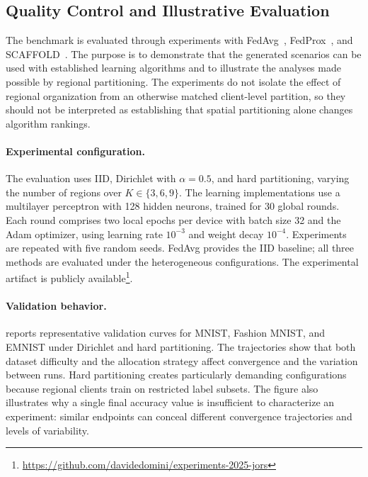 \subsection{Quality Control and Illustrative Evaluation}
\label{sec:profed-quality-control}

The benchmark is evaluated through experiments with
 FedAvg~\cite{DBLP:conf/aistats/McMahanMRHA17},
 FedProx~\cite{DBLP:conf/mlsys/LiSZSTS20}, and
 SCAFFOLD~\cite{DBLP:conf/icml/KarimireddyKMRS20}.
%
The purpose is to demonstrate that the generated scenarios can be used
 with established learning algorithms and to illustrate the analyses made
 possible by regional partitioning.
%
The experiments do not isolate the effect of regional organization from
 an otherwise matched client-level partition, so they should not be
 interpreted as establishing that spatial partitioning alone changes
 algorithm rankings.

\paragraph{Experimental configuration.}
The evaluation uses IID, Dirichlet with $\alpha=0.5$, and hard partitioning,
 varying the number of regions over $K\in\{3,6,9\}$.
%
The learning implementations use a multilayer perceptron with 128 hidden
 neurons, trained for 30 global rounds.
%
Each round comprises two local epochs per device with batch size 32 and
 the Adam optimizer, using learning rate $10^{-3}$ and weight decay $10^{-4}$.
%
Experiments are repeated with five random seeds.
%
FedAvg provides the IID baseline; all three methods are evaluated under
 the heterogeneous configurations.
%
The experimental artifact is publicly
 available\footnote{\url{https://github.com/davidedomini/experiments-2025-jors}}.

\paragraph{Validation behavior.}
 reports representative validation curves for MNIST,
 Fashion MNIST, and EMNIST under Dirichlet and hard partitioning.
%
The trajectories show that both dataset difficulty and the allocation
 strategy affect convergence and the variation between runs.
%
Hard partitioning creates particularly demanding configurations because
 regional clients train on restricted label subsets.
%
The figure also illustrates why a single final accuracy value is insufficient
 to characterize an experiment: similar endpoints can conceal different
 convergence trajectories and levels of variability.

